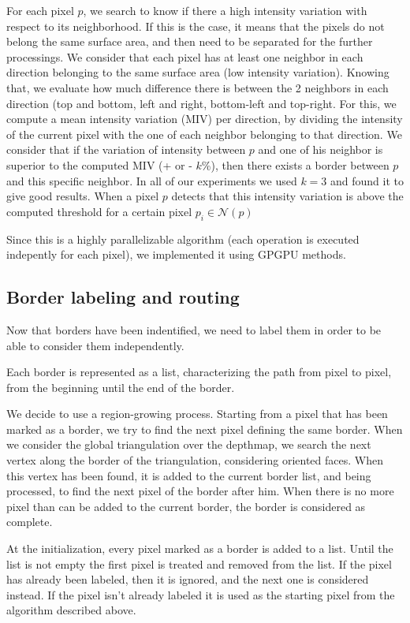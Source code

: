\documentclass[11pt,fleqn]{book} %
\begin{document}
For each pixel $p$, we search to know if there a high intensity variation with respect to its neighborhood. If this is the case, it means that the pixels do not belong the same surface area, and then need to be separated for the further processings.
We consider that each pixel has at least one neighbor in each direction belonging to the same surface area (low intensity variation). Knowing that, we evaluate how much difference there is between the 2 neighbors in each direction (top and bottom, left and right, bottom-left and top-right.
For this, we compute a mean intensity variation (MIV) per direction, by dividing the intensity of the current pixel with the one of each neighbor belonging to that direction. We consider that if the variation of intensity between $p$ and one of his neighbor is superior to the computed MIV (+ or - $k$\%), then there exists a border between $p$ and this specific neighbor. In all of our experiments we used $k = 3$ and found it to give good results.
When a pixel $p$ detects that this intensity variation is above the computed threshold for a certain pixel $p_i \in \mathcal{N}(p)$

Since this is a highly parallelizable algorithm (each operation is executed indepently for each pixel), we implemented it using GPGPU methods.

\subsection{Border labeling and routing}
Now that borders have been indentified, we need to label them in order to be able to consider them independently. 

Each border is represented as a list, characterizing the path from pixel to pixel, from the beginning until the end of the border.

We decide to use a region-growing process. Starting from a pixel that has been marked as a border, we try to find the next pixel defining the same border. When we consider the global triangulation over the depthmap, we search the next vertex along the border of the triangulation, considering oriented faces.
When this vertex has been found, it is added to the current border list, and being processed, to find the next pixel of the border after him.
When there is no more pixel than can be added to the current border, the border is considered as complete.

At the initialization, every pixel marked as a border is added to a list. Until the list is not empty the first pixel is treated and removed from the list. If the pixel has already been labeled, then it is ignored, and the next one is considered instead. If the pixel isn't already labeled it is used as the starting pixel from the algorithm described above.
\end{document}
